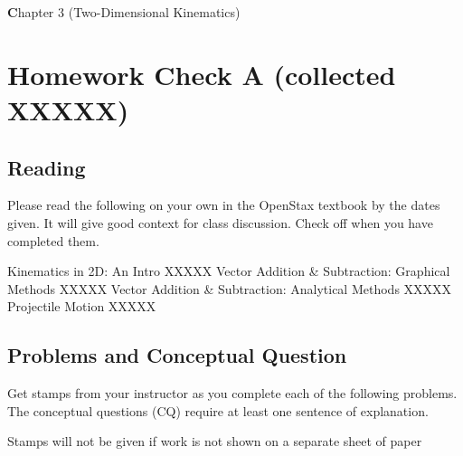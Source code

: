 \documentclass[10pt]{exam}
\author{Rohrbach}
\date{\today}
\def\mytitle{Chapter 3 (Two-Dimensional Kinematics)}
\def\mymaketitle{
  \begin{flushleft}
    {\LARGE \textbf \mytitle \par}
  \end{flushleft}
}
\begin{document}
\mymaketitle



\newcommand{\stampbox}[1]{

  \hfill
  \begin{tikzpicture}[every text node part/.style={align=center}]
     \node[gray!50,draw,rounded corners] at (0,0) 
      {\sc Stamp \\ \sc Here \\ \small #1 \sc Points};
  \end{tikzpicture}
  \vspace{1em}
  
  \hrule

}

\section*{Homework Check A (collected XXXXX)}



\subsection*{Reading}

Please read the following on your own in the OpenStax textbook by the dates given.  It will give good context for class discussion.  Check off when you have completed them.

\vspace{1em}

\begin{checkboxes}
   Kinematics in 2D: An Intro \dotfill XXXXX
   Vector Addition \& Subtraction: Graphical Methods \dotfill XXXXX
   Vector Addition \& Subtraction: Analytical Methods \dotfill XXXXX
   Projectile Motion \dotfill XXXXX
\end{checkboxes}


\subsection*{Problems and Conceptual Question}


Get stamps from your instructor as you complete each of the following problems.  The conceptual questions (CQ) require at least one sentence of explanation.

\vspace{1em}

\noindent
{\sc Stamps will not be given if work is not shown on a separate sheet of paper}
\end{document}
